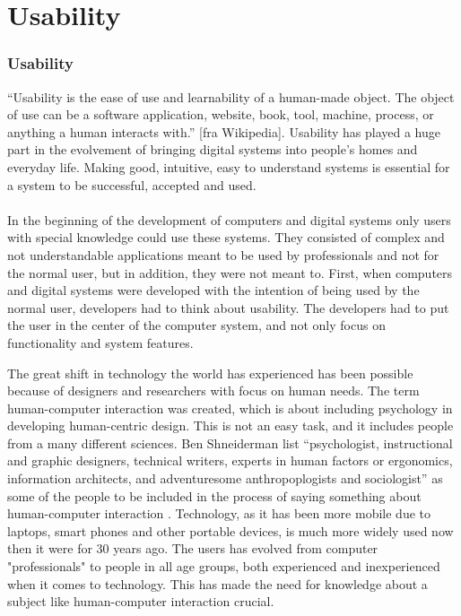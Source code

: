 \chapter{Usability}
\subsection{Usability}
“Usability is the ease of use and learnability of a human-made object. The object of use can be a software application, website, book, tool, machine, process, or anything a human interacts with.” [fra Wikipedia]. Usability has played a huge part in the evolvement of bringing digital systems into people’s homes and everyday life. Making good, intuitive, easy to understand systems is essential for a system to be successful, accepted and used.\\ \\
In the beginning of the development of computers and digital systems only users with special knowledge could use these systems. They consisted of complex and not understandable applications meant to be used by professionals and not for the normal user, but in addition, they were not meant to. First, when computers and digital systems were developed with the intention of being used by the normal user, developers had to think about usability. The developers had to put the user in the center of the computer system, and not only focus on functionality and system features.


The great shift in technology the world has experienced has been possible because of designers and researchers with focus on human needs. The term human-computer interaction was created, which is about including psychology in developing human-centric design. This is not an easy task, and it includes people from a many different sciences. Ben Shneiderman list “psychologist, instructional and graphic designers, technical writers, experts in human factors or ergonomics, information architects, and adventuresome anthropoplogists and sociologist” as some of the people to be included in the process of saying something about human-computer interaction \cite{mmi}. Technology, as it has been more mobile due to laptops, smart phones and other portable devices, is much more widely used now then it were for 30 years ago. The users has evolved from computer "professionals" to people in all age groups, both experienced and inexperienced when it comes to technology. This has made the need for knowledge about a subject like human-computer interaction crucial.    


